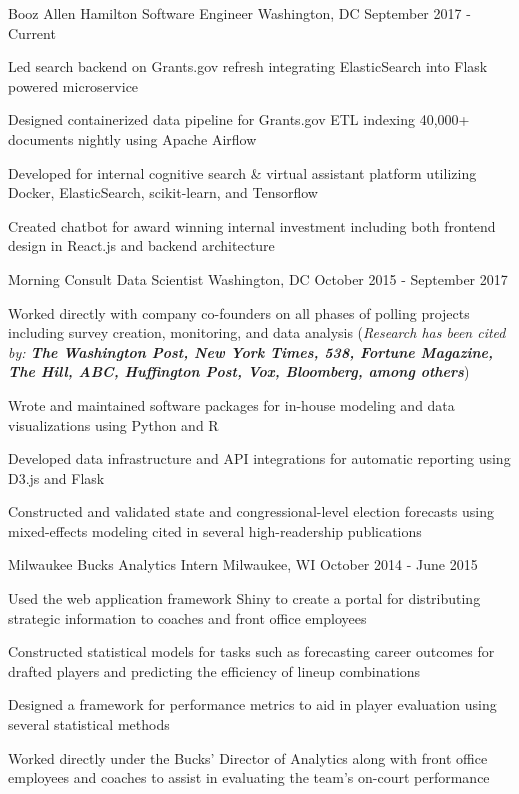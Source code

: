 \documentclass[11pt, a4paper]{awesome-cv}
\begin{document}
\begin{cventries}
  \cventry
    {Booz Allen Hamilton}
    {Software Engineer}
    {Washington, DC}
    {September 2017 - Current}
    {
      \begin{cvitems}
        \item{Led search backend on Grants.gov refresh integrating ElasticSearch into Flask powered microservice}
        \item{Designed containerized data pipeline for Grants.gov ETL indexing 40,000+ documents nightly using Apache Airflow}
        \item{Developed for internal cognitive search \& virtual assistant platform utilizing Docker, ElasticSearch, scikit-learn, and Tensorflow}
        \item{Created chatbot for award winning internal investment including both frontend design in React.js and backend architecture}
      \end{cvitems}
    }
  \cventry
    {Morning Consult}
    {Data Scientist}
    {Washington, DC}
    {October 2015 - September 2017}
    {
      \begin{cvitems}
        \item{Worked directly with company co-founders on all phases of polling projects including survey creation,
        monitoring, and data analysis (\textit{Research has been cited by: \textbf{The Washington Post, New York Times, 538, Fortune Magazine, The Hill, ABC, Huffington Post, Vox, Bloomberg, among others}})}
        \item{Wrote and maintained software packages for in-house modeling and data visualizations using Python and R}
        \item{Developed data infrastructure and API integrations for automatic reporting using D3.js and Flask}
        \item{Constructed and validated state and congressional-level election forecasts using mixed-effects modeling cited in several high-readership publications}
      \end{cvitems}
    }
  \cventry
    {Milwaukee Bucks}
    {Analytics Intern}
    {Milwaukee, WI}
    {October 2014 - June 2015}
    {
      \begin{cvitems}
        \item{Used the web application framework Shiny to create a portal for distributing strategic information to coaches and front office employees}
        \item{Constructed statistical models for tasks such as forecasting career outcomes for drafted players
and predicting the efficiency of lineup combinations}
         \item{Designed a framework for performance metrics to aid in player evaluation using several statistical
methods}
        \item{Worked directly under the Bucks’ Director of Analytics along with front office employees and
coaches to assist in evaluating the team’s on-court performance}
      \end{cvitems}
    }

\end{cventries}
\end{document}
